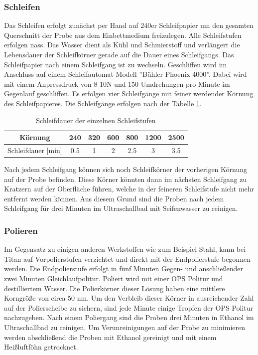 \documentclass[a4paper, 11pt]{tubsreprt}
\begin{document}
\subsubsection{Schleifen}
Das Schleifen erfolgt zunächst per Hand auf 240er Schleifpapier um den gesamten Querschnitt der Probe aus dem Einbettmedium freizulegen. Alle Schleifstufen erfolgen nass. Das Wasser dient als Kühl und Schmierstoff und verlängert die Lebensdauer der Schleifkörner gerade auf die Dauer eines Schleifgangs. Das Schleifpapier nach einem Schleifgang ist zu wechseln. Geschliffen wird im Anschluss auf einem Schleifautomat Modell ''Bühler Phoenix 4000''. Dabei wird mit einem Anpressdruck von 8-10N und 150 Umdrehungen pro Minute im Gegenlauf geschliffen. Es erfolgen vier Schleifgänge mit feiner werdender Körnung des Schleifpapieres. Die Schleifgänge erfolgen nach der Tabelle \ref{Tabelle Schleifdauer Körnung}. 
\begin{table}
\begin{tabular}{c|c|c|c|c|c|c}
Körnung & 240 & 320 & 600 & 800 & 1200 & 2500 \\
\hline
Schleifdauer [min] & 0.5 & 1 & 2 & 2.5 & 3 & 3.5 \\
\end{tabular}
\caption{Schleifdauer der einzelnen Schleifstufen}
\label{Tabelle Schleifdauer Körnung}
\end{table}
Nach jedem Schleifgang können sich noch Schleifkörner der vorherigen Körnung auf der Probe befinden. Diese Körner könnten dann im nächsten Schleifgang zu Kratzern auf der Oberfläche führen, welche in der feineren Schleifstufe nicht mehr entfernt werden können. Aus diesem Grund sind die Proben nach jedem Schleifgang für drei Minuten im Ultraschallbad mit Seifenwasser zu reinigen. 

\subsubsection{Polieren}
Im Gegensatz zu einigen anderen Werkstoffen wie zum Beispiel Stahl, kann bei Titan auf Vorpolierstufen verzichtet und direkt mit der Endpolierstufe begonnen werden. Die Endpolierstufe erfolgt in  fünf Minuten Gegen- und anschließender zwei Minuten Gleichlaufpolitur. Poliert wird mit einer OPS Politur und destilliertem Wasser. Die Polierkörner dieser Lösung haben eine mittlere Korngröße von circa 50 nm. Um den Verbleib dieser Körner in ausreichender Zahl auf der Polierscheibe zu sichern, sind jede Minute einige Tropfen der OPS Politur nachzugeben. Nach einem Poliergang sind die Proben drei Minuten in Ethanol im Ultraschallbad zu reinigen. Um Verunreinigungen auf der Probe zu minimieren werden abschließend die Proben mit Ethanol gereinigt und mit einem Heißluftföhn getrocknet.
\end{document}

